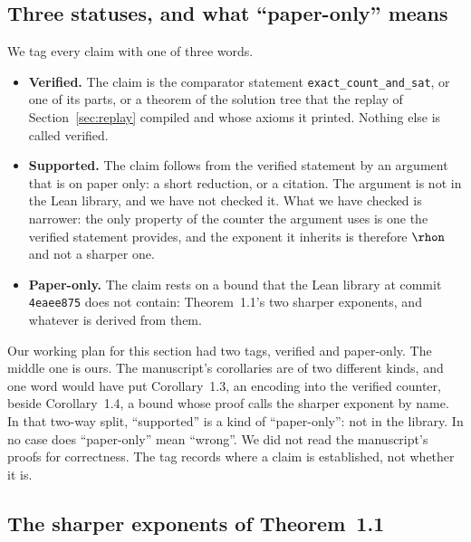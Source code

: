 \subsection{Three statuses, and what ``paper-only'' means}
\label{sec:beyond-statuses}

We tag every claim with one of three words.

\begin{itemize}
\item \textbf{Verified.} The claim is the comparator statement
  \texttt{exact\_count\_and\_sat}, or one of its parts, or a theorem of
  the solution tree that the replay of Section~\ref{sec:replay} compiled
  and whose axioms it printed. Nothing else is called verified.
\item \textbf{Supported.} The claim follows from the verified statement
  by an argument that is on paper only: a short reduction, or a
  citation. The argument is not in the Lean library, and we have not
  checked it. What we have checked is narrower: the only property of
  the counter the argument uses is one the verified statement provides,
  and the exponent it inherits is therefore $\rhon$ and not a sharper
  one.
\item \textbf{Paper-only.} The claim rests on a bound that the Lean
  library at commit \texttt{4eaee875} does not contain: Theorem~1.1's
  two sharper exponents, and whatever is derived from them.
\end{itemize}

Our working plan for this section had two tags, verified and paper-only. The
middle one is ours. The manuscript's corollaries are of two different
kinds, and one word would have put Corollary~1.3, an encoding into the
verified counter, beside Corollary~1.4, a bound whose proof calls the
sharper exponent by name. In that two-way split, ``supported'' is
a kind of ``paper-only'': not in the library. In no case does
``paper-only'' mean ``wrong''. We did not read the manuscript's proofs
for correctness. The tag records where a claim is established, not
whether it is.

\subsection{The sharper exponents of Theorem~1.1}
\label{sec:beyond-exponents}


